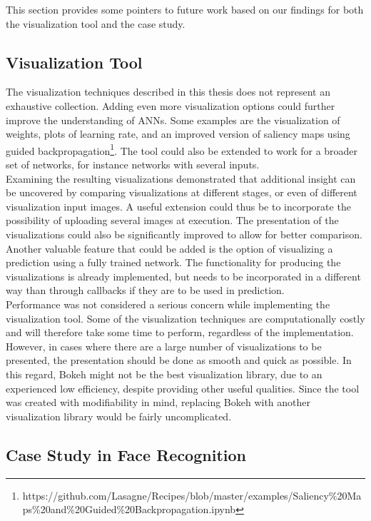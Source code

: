 This section provides some pointers to future work based on our findings for both the visualization tool and the case study.

\subsection{Visualization Tool}

The visualization techniques described in this thesis does not represent an exhaustive collection. Adding even more visualization options could further improve the understanding of ANNs. Some examples are the visualization of weights, plots of learning rate, and an improved version of saliency maps using guided backpropagation\footnote{https://github.com/Lasagne/Recipes/blob/master/examples/Saliency\%20Maps\%20and\%20Guided\%20Backpropagation.ipynb}. The tool could also be extended to work for a broader set of networks, for instance networks with several inputs. \\

\noindent Examining the resulting visualizations demonstrated that additional insight can be uncovered by comparing visualizations at different stages, or even of different visualization input images. A useful extension could thus be to incorporate the possibility of uploading several images at execution. The presentation of the visualizations could also be significantly improved to allow for better comparison. Another valuable feature that could be added is the option of visualizing a prediction using a fully trained network. The functionality for producing the visualizations is already implemented, but needs to be incorporated in a different way than through callbacks if they are to be used in prediction.\\

\noindent Performance was not considered a serious concern while implementing the visualization tool. Some of the visualization techniques are computationally costly and will therefore take some time to perform, regardless of the implementation. However, in cases where there are a large number of visualizations to be presented, the presentation should be done as smooth and quick as possible. In this regard, Bokeh might not be the best visualization library, due to an experienced low efficiency, despite providing other useful qualities. Since the tool was created with modifiability in mind, replacing Bokeh with another visualization library would be fairly uncomplicated.

\subsection{Case Study in Face Recognition}

